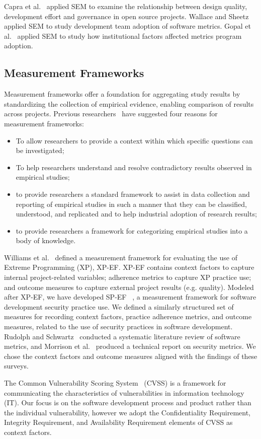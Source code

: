 Capra et al.~\cite{capra2008empirical} applied SEM to examine the relationship between design quality, development effort and governance in open source projects. Wallace and Sheetz~\cite{wallace2014adoption} applied SEM to study development team adoption of software metrics. Gopal et al.~\cite{gopal2005impact} applied SEM to study how institutional factors affected metrics program adoption.

\subsection{Measurement Frameworks}
Measurement frameworks offer a foundation for aggregating study results by standardizing the collection of empirical evidence, enabling comparison of results across projects. Previous researchers~\cite{kitchenham1999towards,williams2004toward} have suggested four reasons for measurement frameworks:
\begin{itemize}
	\item To allow researchers to provide a context within which specific questions can be investigated;
	\item To help researchers understand and resolve contradictory results observed in empirical studies;
	\item to provide researchers a standard framework to assist in data collection and reporting of empirical studies in such a manner that they can be classified, understood, and replicated and to help industrial adoption of research results;
	\item  to provide researchers a framework for categorizing empirical studies into a body of knowledge.
\end{itemize}

Williams et al.~\cite{williams2004toward} defined a measurement framework for evaluating the use of Extreme Programming (XP), XP-EF. XP-EF contains context factors to capture internal project-related variables; adherence metrics to capture XP practice use; and outcome measures to capture external project results (e.g. quality). Modeled after XP-EF, we have developed SP-EF ~\cite{morrison2016spefsite}, a measurement framework for software development security practice use. We defined a similarly structured set of measures for recording context factors, practice adherence metrics, and outcome measures, related to the use of security practices in software development.
Rudolph and Schwartz~\cite{rudolph2012critical} conducted a systematic literature review of software metrics, and Morrison et al.~\cite{morrison2014mapping} produced a technical report on security metrics. We chose the context factors and outcome measures aligned with the findings of these surveys.

The Common Vulnerability Scoring System~\cite{mell2006common} (CVSS) is a framework for communicating the characteristics of vulnerabilities in information technology (IT). Our focus is on the software development process and product rather than the individual vulnerability, however we adopt the Confidentiality Requirement, Integrity Requirement, and Availability Requirement elements of CVSS as context factors.